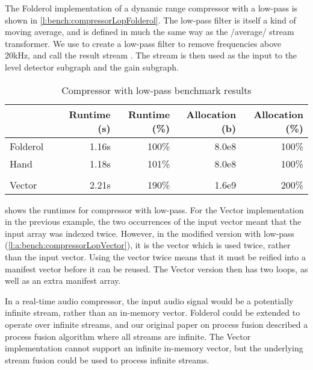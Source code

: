 The Folderol implementation of a dynamic range compressor with a low-pass is shown in \cref{l:bench:compressorLopFolderol}.
The low-pass filter is itself a kind of moving average, and is defined in much the same way as the \Hs/average/ stream transformer.
We use \Hs@postscanl@ to create a low-pass filter to remove frequencies above 20kHz, and call the result stream \Hs@lopass@.
The \Hs@lopass@ stream is then used as the input to the level detector subgraph and the gain subgraph.

\begin{table}
\begin{center}
\begin{tabular}{ll|rrrr}
& & Runtime (s)  & Runtime (\%) & Allocation (b) & Allocation (\%) \\
\hline
Folderol &          & 1.16s &   100\% & 8.0e8 & 100\% \\
Hand     &          & 1.18s &   101\% & 8.0e8 & 100\% \\
&&&\\
Vector &            & 2.21s &   190\% & 1.6e9 & 200\%\\
\end{tabular}
\end{center}
\caption[Compressor with low-pass benchmark results]{Compressor with low-pass benchmark results}
\label{table:bench:compressorlop}
\end{table}

 shows the runtimes for compressor with low-pass.
For the Vector implementation in the previous example, the two occurrences of the input vector meant that the input array was indexed twice.
However, in the modified version with low-pass (\cref{l:a:bench:compressorLopVector}), it is the \Hs@lopass@ vector which is used twice, rather than the input vector.
Using the \Hs@lopass@ vector twice means that it must be reified into a manifest vector before it can be reused.
The Vector version then has two loops, as well as an extra manifest array.

In a real-time audio compressor, the input audio signal would be a potentially infinite stream, rather than an in-memory vector.
Folderol could be extended to operate over infinite streams, and our original paper on process fusion \citep{robinson2017machine} described a process fusion algorithm where all streams are infinite.
The Vector implementation cannot support an infinite in-memory vector, but the underlying stream fusion \citep{coutts2007stream} could be used to process infinite streams.


